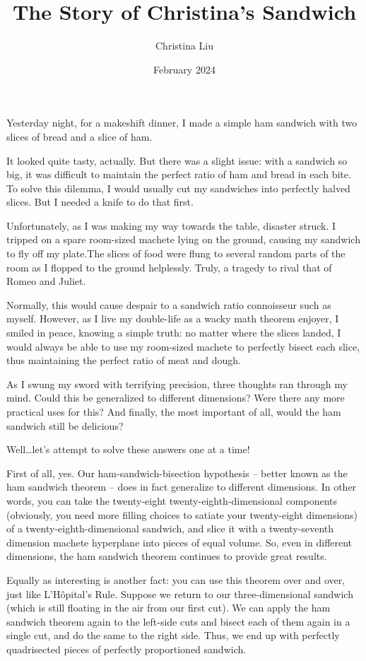 \documentclass{article}
\title{The Story of Christina's Sandwich}
\author{Christina Liu}
\date{February 2024}
\begin{document}
\maketitle

Yesterday night, for a makeshift dinner, I made a simple ham sandwich with two slices of bread and a slice of ham.

It looked quite tasty, actually. But there was a slight issue: with a sandwich so big, it was difficult to maintain the perfect ratio of ham and bread in each bite. To solve this dilemma, I would usually cut my sandwiches into perfectly halved slices. But I needed a knife to do that first.

Unfortunately, as I was making my way towards the table, disaster struck. I tripped on a spare room-sized machete lying on the ground, causing my sandwich to fly off my plate.The slices of food were flung to several random parts of the room as I flopped to the ground helplessly. Truly, a tragedy to rival that of Romeo and Juliet.

Normally, this would cause despair to a sandwich ratio connoisseur such as myself. However, as I live my double-life as a wacky math theorem enjoyer, I smiled in peace, knowing a simple truth: no matter where the slices landed, I would always be able to use my room-sized machete to perfectly bisect each slice, thus maintaining the perfect ratio of meat and dough.

As I swung my sword with terrifying precision, three thoughts ran through my mind. Could this be generalized to different dimensions? Were there any more practical uses for this? And finally, the most important of all, would the ham sandwich still be delicious?

Well…let’s attempt to solve these answers one at a time!

First of all, yes. Our ham-sandwich-bisection hypothesis – better known as the ham sandwich theorem – does in fact generalize to different dimensions. In other words, you can take the twenty-eight twenty-eighth-dimensional components (obviously, you need more filling choices to satiate your twenty-eight dimensions) of a twenty-eighth-dimensional sandwich, and slice it with a twenty-seventh dimension machete hyperplane into pieces of equal volume. So, even in different dimensions, the ham sandwich theorem continues to provide great results.

Equally as interesting is another fact: you can use this theorem over and over, just like L'Hôpital's Rule. Suppose we return to our three-dimensional sandwich (which is still floating in the air from our first cut). We can apply the ham sandwich theorem again to the left-side cuts and bisect each of them again in a single cut, and do the same to the right side. Thus, we end up with perfectly quadrisected pieces of perfectly proportioned sandwich.
\end{document}

